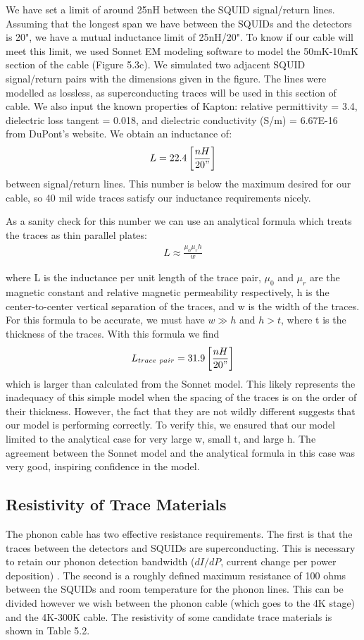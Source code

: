 \documentclass{report}
\begin{document}
We have set a limit of around 25nH between the SQUID signal/return lines. Assuming that the longest span we have between the SQUIDs and the detectors is 20", we have a mutual inductance limit of 25nH/20". To know if our cable will meet this limit, we used Sonnet EM modeling software to model the 50mK-10mK section of the cable (Figure 5.3c). We simulated two adjacent SQUID signal/return pairs with the dimensions given in the figure. The lines were modelled as lossless, as superconducting traces will be used in this section of cable. We also input the known properties of Kapton: relative permittivity = 3.4, dielectric loss tangent = 0.018, and dielectric conductivity (S/m) = 6.67E-16 from DuPont's website. We obtain an inductance of:
$$
L = 22.4\left[\frac{nH}{20"}\right]
$$
between signal/return lines. This number is below the maximum desired for our cable, so 40 mil wide traces satisfy our inductance requirements nicely.

As a sanity check for this number we can use an analytical formula which treats the traces as thin parallel plates:
\begin{eqnarray}
L \approx \frac{\mu_{0} \mu_{r} h}{w}
\end{eqnarray}

where L is the inductance per unit length of the trace pair, $\mu_{0}$ and $\mu_{r}$ are the magnetic constant and relative magnetic permeability respectively, h is the center-to-center vertical separation of the traces, and w is the width of the traces. For this formula to be accurate, we must have $w\gg h$ and $h > t$, where t is the thickness of the traces. With this formula we find
$$
L_{trace \ pair} = 31.9\left[\frac{nH}{20"}\right]
$$
which is larger than calculated from the Sonnet model. This likely represents the inadequacy of this simple model when the spacing of the traces is on the order of their thickness. However, the fact that they are not wildly different suggests that our model is performing correctly. To verify this, we ensured that our model limited to the analytical case for very large w, small t, and large h. The agreement between the Sonnet model and the analytical formula in this case was very good, inspiring confidence in the model.

\subsection{Resistivity of Trace Materials}
The phonon cable has two effective resistance requirements. The first is that the traces between the detectors and SQUIDs are superconducting. This is necessary to retain our phonon detection bandwidth ($dI/dP$, current change per power deposition) \cite{Pyle2012}. The second is a roughly defined maximum resistance of 100 ohms between the SQUIDs and room temperature for the phonon lines. This can be divided however we wish between the phonon cable (which goes to the 4K stage) and the 4K-300K cable. The resistivity of some candidate trace materials is shown in Table 5.2.
\end{document}
